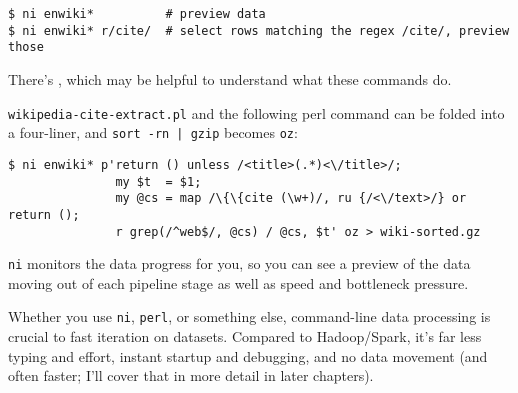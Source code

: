 \begin{verbatim}
$ ni enwiki*          # preview data
$ ni enwiki* r/cite/  # select rows matching the regex /cite/, preview those \end{verbatim}

There's
, which may be helpful to understand what
these commands do.

{\tt wikipedia-cite-extract.pl} and the following perl command can be folded
into a four-liner, and \verb/sort -rn | gzip/ becomes {\tt oz}:

\begin{verbatim}
$ ni enwiki* p'return () unless /<title>(.*)<\/title>/;
               my $t  = $1;
               my @cs = map /\{\{cite (\w+)/, ru {/<\/text>/} or return ();
               r grep(/^web$/, @cs) / @cs, $t' oz > wiki-sorted.gz\end{verbatim}

{\tt ni} monitors the data progress for you, so you can see a preview of the
data moving out of each pipeline stage as well as speed and bottleneck pressure.

Whether you use {\tt ni}, {\tt perl}, or something else, command-line data
processing is crucial to fast iteration on datasets. Compared to Hadoop/Spark,
it's far less typing and effort, instant startup and debugging, and no data
movement (and often faster; I'll cover that in more detail in later chapters).

